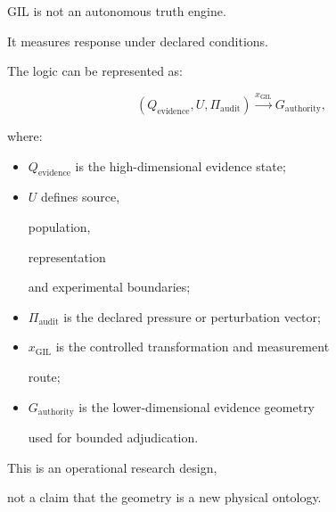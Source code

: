 \documentclass[11pt,a4paper,oneside]{report}
\begin{document}
GIL is not an autonomous truth engine.



It measures response under declared conditions.



The logic can be represented as:



\begin{equation}
\label{eq:gil-transform}
\left(
Q_{\mathrm{evidence}},
U,
\Pi_{\mathrm{audit}}
\right)
\xrightarrow{x_{\mathrm{GIL}}}
G_{\mathrm{authority}},
\end{equation}



where:



\begin{itemize}



\item

$Q_{\mathrm{evidence}}$ is the high-dimensional evidence state;



\item

$U$ defines source,

population,

representation

and experimental boundaries;



\item

$\Pi_{\mathrm{audit}}$ is the declared pressure or perturbation vector;



\item

$x_{\mathrm{GIL}}$ is the controlled transformation and measurement

route;



\item

$G_{\mathrm{authority}}$ is the lower-dimensional evidence geometry

used for bounded adjudication.



\end{itemize}



This is an operational research design,

not a claim that the geometry is a new physical ontology.
\end{document}
